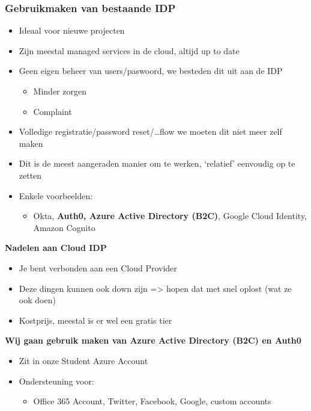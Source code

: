 \documentclass{article}
\begin{document}
\subsubsection{Gebruikmaken van bestaande IDP}

\begin{itemize}
    \item Ideaal voor nieuwe projecten
    \item Zijn meestal managed services in de cloud, altijd up to date
    \item Geen eigen beheer van users/paswoord, we besteden dit uit aan de IDP
    \begin{itemize}
        \item Minder zorgen
        \item Complaint
    \end{itemize}
    \item Volledige registratie/password reset/\dots flow we moeten dit niet meer zelf maken
    \item Dit is de meest aangeraden manier om te werken, `relatief' eenvoudig op te zetten
    \item Enkele voorbeelden:
    \begin{itemize}
        \item Okta, \textbf{Auth0, Azure Active Directory (B2C)}, Google Cloud Identity, Amazon Cognito
    \end{itemize}
\end{itemize}

\textbf{Nadelen aan Cloud IDP}

\begin{itemize}
    \item Je bent verbonden aan een Cloud Provider
    \item Deze dingen kunnen ook down zijn => hopen dat met snel oplost (wat ze ook doen)
    \item Kostprijs, meestal is er wel een gratis tier
\end{itemize}

\textbf{Wij gaan gebruik maken van Azure Active Directory (B2C) en Auth0}

\begin{itemize}
    \item Zit in onze Student Azure Account
    \item Ondersteuning voor:
    \begin{itemize}
        \item Office 365 Account, Twitter, Facebook, Google, custom accounts
    \end{itemize}
\end{itemize}
\end{document}
